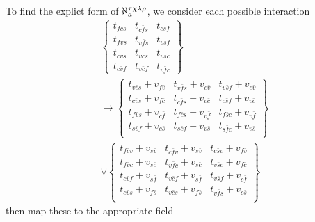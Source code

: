 To find the explict form of \(\aleph_a^{\tau \chi \lambda \rho}\), we consider each possible interaction
\begin{align*}
   & \begin{Bmatrix}
       t_{f \bar{c} s} & t_{c \bar{f} s} & t_{c \bar{s} f} \\
       t_{f \bar{v} s} & t_{v \bar{f} s} & t_{v \bar{s} f} \\
       t_{c \bar{v} s} & t_{v \bar{c} s} & t_{v \bar{s} c} \\
       t_{c \bar{v} f} & t_{v \bar{c} f} & t_{v \bar{f} c}
     \end{Bmatrix}                                        \\
   & \longrightarrow
  \begin{Bmatrix}
    t_{v \bar{c} s}+v_{f \bar{v}} & t_{v \bar{f} s}+v_{c \bar{v}} & t_{v \bar{s} f}+v_{c \bar{v}} \\
    t_{c \bar{v} s}+v_{f \bar{c}} & t_{c \bar{f} s}+v_{v \bar{c}} & t_{c \bar{s} f}+v_{v \bar{c}} \\
    t_{f \bar{v} s}+v_{c \bar{f}} & t_{f \bar{c} s}+v_{v \bar{f}} & t_{f \bar{s} c}+v_{v \bar{f}} \\
    t_{s \bar{v} f}+v_{c \bar{s}} & t_{s \bar{c} f}+v_{v \bar{s}} & t_{s \bar{f} c}+v_{v \bar{s}} \\
  \end{Bmatrix} \\
   & \lor
  \begin{Bmatrix}
    t_{f \bar{c} v}+v_{s \bar{v}} & t_{c \bar{f} v}+v_{s \bar{v}} & t_{c \bar{s} v}+v_{f \bar{v}} \\
    t_{f \bar{v} c}+v_{s \bar{c}} & t_{v \bar{f} c}+v_{s \bar{c}} & t_{v \bar{s} c}+v_{f \bar{c}} \\
    t_{c \bar{v} f}+v_{s \bar{f}} & t_{v \bar{c} f}+v_{s \bar{f}} & t_{v \bar{s} f}+v_{c \bar{f}} \\
    t_{c \bar{v} s}+v_{f \bar{s}} & t_{v \bar{c} s}+v_{f \bar{s}} & t_{v \bar{f} s}+v_{c \bar{s}} \\
  \end{Bmatrix}
\end{align*}
then map these to the appropriate field
